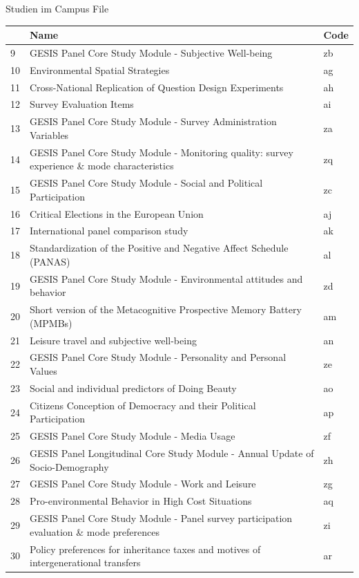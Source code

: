 \documentclass[ignorenonframetext,]{beamer}
\begin{document}
\begin{frame}{Studien im Campus File}

\begin{tabular}{l|l|l}
\hline
  & Name & Code\\
\hline
9 & GESIS Panel Core Study Module - Subjective Well-being & zb\\
\hline
10 & Environmental Spatial Strategies & ag\\
\hline
11 & Cross-National Replication of Question Design Experiments & ah\\
\hline
12 & Survey Evaluation Items & ai\\
\hline
13 & GESIS Panel Core Study Module - Survey Administration Variables & za\\
\hline
14 & GESIS Panel Core Study Module - Monitoring quality: survey experience \& mode characteristics & zq\\
\hline
15 & GESIS Panel Core Study Module - Social and Political Participation & zc\\
\hline
16 & Critical Elections in the European Union & aj\\
\hline
17 & International panel comparison study & ak\\
\hline
18 & Standardization of the Positive and Negative Affect Schedule (PANAS) & al\\
\hline
19 & GESIS Panel Core Study Module - Environmental attitudes and behavior & zd\\
\hline
20 & Short version of the Metacognitive Prospective Memory Battery (MPMBs) & am\\
\hline
21 & Leisure travel and subjective well-being & an\\
\hline
22 & GESIS Panel Core Study Module - Personality and Personal Values & ze\\
\hline
23 & Social and individual predictors of Doing Beauty & ao\\
\hline
24 & Citizens Conception of Democracy and their Political Participation & ap\\
\hline
25 & GESIS Panel Core Study Module - Media Usage & zf\\
\hline
26 & GESIS Panel Longitudinal Core Study Module - Annual Update of Socio-Demography & zh\\
\hline
27 & GESIS Panel Core Study Module - Work and Leisure & zg\\
\hline
28 & Pro-environmental Behavior in High Cost Situations & aq\\
\hline
29 & GESIS Panel Core Study Module - Panel survey participation evaluation \& mode preferences & zi\\
\hline
30 & Policy preferences for inheritance taxes and motives of intergenerational transfers & ar\\
\hline
\end{tabular}


\end{frame}
\end{document}
